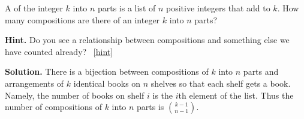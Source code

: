 \documentclass{book}
\begin{document}
\setcounter{project}{128}
\addtocounter{project}{-1}
\begin{activity}[]\label{compositionagian}
\hypertarget{p-890}{}%
A  of the integer \(k\) into \(n\) parts is a list of \(n\) positive integers that add to \(k\).  How many compositions are there of an integer \(k\) into \(n\) parts?%
\par\smallskip%
\noindent\textbf{Hint.}\hypertarget{hint-86}{}\quad%
\hypertarget{p-891}{}%
Do you see a relationship between compositions and something else we have counted already?%
~\hfill{\tiny\hyperlink{a-128}{[hint]}\hypertarget{q-128}{}}\par\smallskip%
\noindent\textbf{Solution.}\hypertarget{solution-86}{}\quad%
\hypertarget{p-892}{}%
There is a bijection between compositions of \(k\) into \(n\) parts and arrangements of \(k\) identical books on \(n\) shelves so that each shelf gets a book. Namely, the number of books on shelf \(i\) is the \(i\)th element of the list. Thus the number of compositions of \(k\) into \(n\) parts is \(\binom{k-1}{n-1}\).%
\end{activity}
\end{document}
